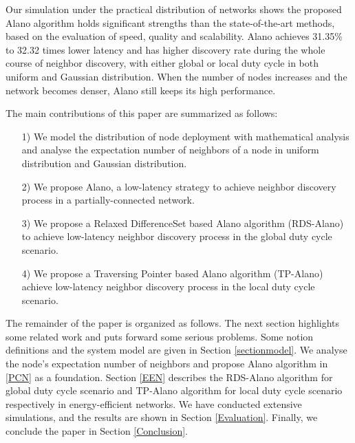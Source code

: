 Our simulation under the practical distribution of networks 
\cite{wang2013gaussian} shows the proposed Alano algorithm
holds significant strengths than the state-of-the-art methods,
based on the evaluation of speed, quality and scalability.
Alano achieves 31.35\% to 32.32 times lower latency
and has higher discovery rate during the whole course of neighbor discovery, 
with either global or local duty cycle in both uniform and Gaussian distribution.
When the number of nodes increases and the network becomes denser, 
Alano still keeps its high performance. 


The main contributions of this paper are summarized as follows:
\begin{itemize}
\item[1)] We model the distribution of node deployment with mathematical analysis 
and analyse the expectation number of neighbors of a node in uniform distribution and Gaussian
distribution.
\item[2)] We propose Alano, a low-latency strategy to achieve neighbor discovery process
in a partially-connected network.
\item[3)] We propose a Relaxed DifferenceSet based Alano algorithm (RDS-Alano) 
to achieve low-latency neighbor discovery process in the global duty cycle scenario. 
\item[4)] We propose a Traversing Pointer based Alano algorithm (TP-Alano) 
achieve low-latency neighbor discovery process in the local duty cycle scenario. 
\end{itemize}


The remainder of the paper is organized as follows.
The next section highlights some related work and 
puts forward some serious problems. 
Some notion definitions and the system model are given in Section
\ref{sectionmodel}. 
We analyse the node's expectation number of neighbors and 
propose Alano algorithm in \ref{PCN} as a foundation.
Section \ref{EEN} describes the RDS-Alano algorithm for global
duty cycle scenario and TP-Alano algorithm for local duty cycle scenario
respectively in energy-efficient networks.
We have conducted extensive simulations, and the results are shown in Section
\ref{Evaluation}. Finally, we conclude the paper in Section
\ref{Conclusion}.

